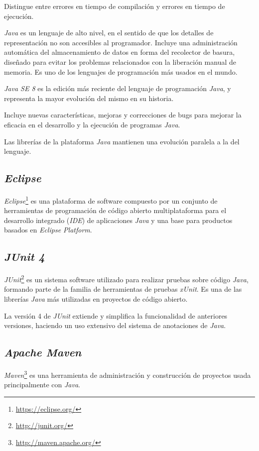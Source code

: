 Distingue entre errores en tiempo de compilación y errores en tiempo de ejecución.

\textit{Java} es un lenguaje de alto nivel, en el sentido de que los detalles de representación no son accesibles al programador. 
Incluye una administración automática del almacenamiento de datos en forma del recolector de basura, diseñado para evitar los problemas relacionados con la liberación manual de memoria. Es uno de los lenguajes de programación más usados en el mundo.\cite{java}

\textit{Java SE 8} es la edición más reciente del lenguaje de programación \textit{Java}, y representa la mayor evolución del mismo en su historia.

Incluye nuevas características, mejoras y correcciones de bugs para mejorar la eficacia en el desarrollo y la ejecución de programas \textit{Java}. 
 
Las librerías de la plataforma \textit{Java} mantienen una evolución paralela a la del lenguaje.

\subsection{\textit{Eclipse}}
\textit{Eclipse}\footnote{\url{https://eclipse.org/}} es una plataforma de software compuesto por un conjunto de herramientas de programación de código abierto multiplataforma para el desarrollo integrado (\textit{IDE}) de aplicaciones \textit{Java}  y una base para productos basados en \textit{Eclipse Platform}.


\subsection{\textit{JUnit 4}}
\textit{JUnit}\footnote{\url{http://junit.org/}} es un sistema software utilizado para realizar pruebas sobre código \textit{Java}, formando parte de la familia de herramientas de pruebas \textit{xUnit}.
Es una de las librerías \textit{Java} más utilizadas en proyectos de código abierto.

La versión 4 de \textit{JUnit} extiende y simplifica la funcionalidad de anteriores versiones, haciendo un uso extensivo del sistema de anotaciones de \textit{Java}.


\subsection{\textit{Apache Maven}}
\textit{Maven}\footnote{\url{http://maven.apache.org/}} es una herramienta de administración y construcción de proyectos usada principalmente con \textit{Java}.

